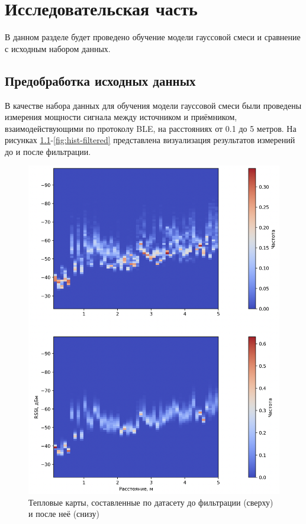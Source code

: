 \chapter{Исследовательская часть}

В данном разделе будет проведено обучение модели гауссовой смеси и сравнение с исходным набором данных.

\section{Предобработка исходных данных}

В качестве набора данных для обучения модели гауссовой смеси были проведены измерения мощности сигнала между источником и приёмником, взаимодействующими по протоколу BLE, на расстояниях от 0.1 до 5 метров. На рисунках \ref{fig:heatmap}-\ref{fig:hist-filtered} представлена визуализация результатов измерений до и после фильтрации.

\begin{figure}[H]
	\centering
	\includegraphics[width=\textwidth]{assets/heatmap.png}
	\caption{Тепловые карты, составленные по датасету до фильтрации (сверху) и после неё (снизу)}
	\label{fig:heatmap}
\end{figure}

